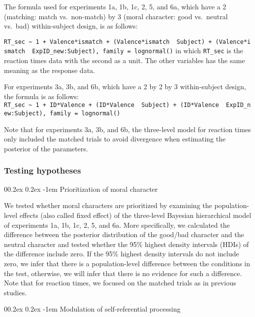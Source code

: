 \documentclass[
  man]{apa6}
\makeatletter
\let\oldparagraph\paragraph
\renewcommand{\paragraph}[1]{\oldparagraph{#1}\mbox{}}
\renewcommand{\paragraph}{\@startsection{paragraph}{4}{\parindent}%
  {0\baselineskip \@plus 0.2ex \@minus 0.2ex}%
  {-1em}%
  {\normalfont\normalsize\bfseries\itshape\typesectitle}}
\makeatother
\begin{document}
The formula used for experiments 1a, 1b, 1c, 2, 5, and 6a, which have a 2 (matching: match vs.~non-match) by 3 (moral character: good vs.~neutral vs.~bad) within-subject design, is as follows:

\texttt{RT\_sec\ \textasciitilde{}\ 1\ +\ Valence*ismatch\ +\ (Valence*ismatch\ \textbar{}\ Subject)\ +\ (Valence*ismatch\ \textbar{}\ ExpID\_new:Subject),\ family\ =\ lognormal()}
in which \texttt{RT\_sec} is the reaction times data with the second as a unit. The other variables has the same meaning as the response data.

For experiments 3a, 3b, and 6b, which have a 2 by 2 by 3 within-subject design, the formula is as follows:
\texttt{RT\_sec\ \textasciitilde{}\ 1\ +\ ID*Valence\ +\ (ID*Valence\ \textbar{}\ Subject)\ +\ (ID*Valence\ \textbar{}\ ExpID\_new:Subject),\ family\ =\ lognormal()}

Note that for experiments 3a, 3b, and 6b, the three-level model for reaction times only included the matched trials to avoid divergence when estimating the posterior of the parameters.

\hypertarget{testing-hypotheses}{%
\subsubsection{Testing hypotheses}\label{testing-hypotheses}}

\hypertarget{prioritization-of-moral-character}{%
\paragraph{Prioritization of moral character}\label{prioritization-of-moral-character}}

We tested whether moral characters are prioritized by examining the population-level effects (also called fixed effect) of the three-level Bayesian hierarchical model of experiments 1a, 1b, 1c, 2, 5, and 6a. More specifically, we calculated the difference between the posterior distribution of the good/bad character and the neutral character and tested whether the 95\% highest density intervals (HDIs) of the difference include zero. If the 95\% highest density intervals do not include zero, we infer that there is a population-level difference between the conditions in the test, otherwise, we will infer that there is no evidence for such a difference. Note that for reaction times, we focused on the matched trials as in previous studies.

\hypertarget{modulation-of-self-referential-processing}{%
\paragraph{Modulation of self-referential processing}\label{modulation-of-self-referential-processing}}
\end{document}
